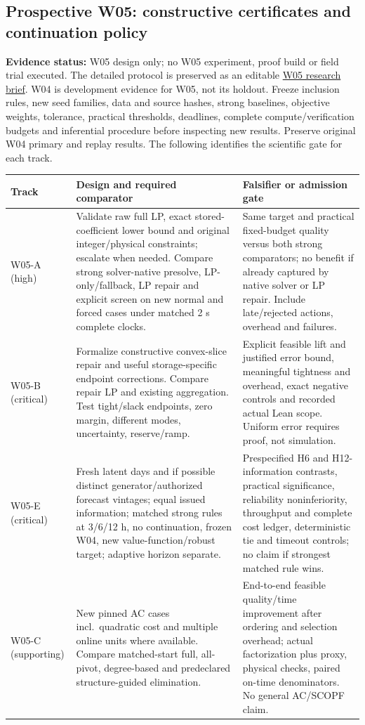 \documentclass[11pt,letterpaper]{article}
\newcommand{\status}[1]{\textbf{Evidence status:} #1}
\begin{document}
\subsection{Prospective W05: constructive certificates and continuation policy}
\label{sec:w05}
\status{W05 design only; no W05 experiment, proof build or field trial executed.}
The detailed protocol is preserved as an editable \href{https://chatgpt.com/space/page_bf81339983a48191928bd72248e6a67a}{W05 research brief}. W04 is development evidence for W05, not its holdout. Freeze inclusion rules, new seed families, data and source hashes, strong baselines, objective weights, tolerance, practical thresholds, deadlines, complete compute/verification budgets and inferential procedure before inspecting new results. Preserve original W04 primary and replay results. The following identifies the scientific gate for each track.

\begin{longtable}{P{.15\linewidth}P{.42\linewidth}P{.34\linewidth}}
\toprule Track & Design and required comparator & Falsifier or admission gate\\\midrule\endhead
W05-A (high) & Validate raw full LP, exact stored-coefficient lower bound and original integer/physical constraints; escalate when needed. Compare strong solver-native presolve, LP-only/fallback, LP repair and explicit screen on new normal and forced cases under matched 2 s complete clocks. & Same target and practical fixed-budget quality versus both strong comparators; no benefit if already captured by native solver or LP repair. Include late/rejected actions, overhead and failures.\\
W05-B (critical) & Formalize constructive convex-slice repair and useful storage-specific endpoint corrections. Compare repair LP and existing aggregation. Test tight/slack endpoints, zero margin, different modes, uncertainty, reserve/ramp. & Explicit feasible lift and justified error bound, meaningful tightness and overhead, exact negative controls and recorded actual Lean scope. Uniform error requires proof, not simulation.\\
W05-E (critical) & Fresh latent days and if possible distinct generator/authorized forecast vintages; equal issued information; matched strong rules at 3/6/12 h, no continuation, frozen W04, new value-function/robust target; adaptive horizon separate. & Prespecified H6 and H12-information contrasts, practical significance, reliability noninferiority, throughput and complete cost ledger, deterministic tie and timeout controls; no claim if strongest matched rule wins.\\
W05-C (supporting) & New pinned AC cases incl.\ quadratic cost and multiple online units where available. Compare matched-start full, all-pivot, degree-based and predeclared structure-guided elimination. & End-to-end feasible quality/time improvement after ordering and selection overhead; actual factorization plus proxy, physical checks, paired on-time denominators. No general AC/SCOPF claim.\\
\bottomrule
\end{longtable}
\end{document}
